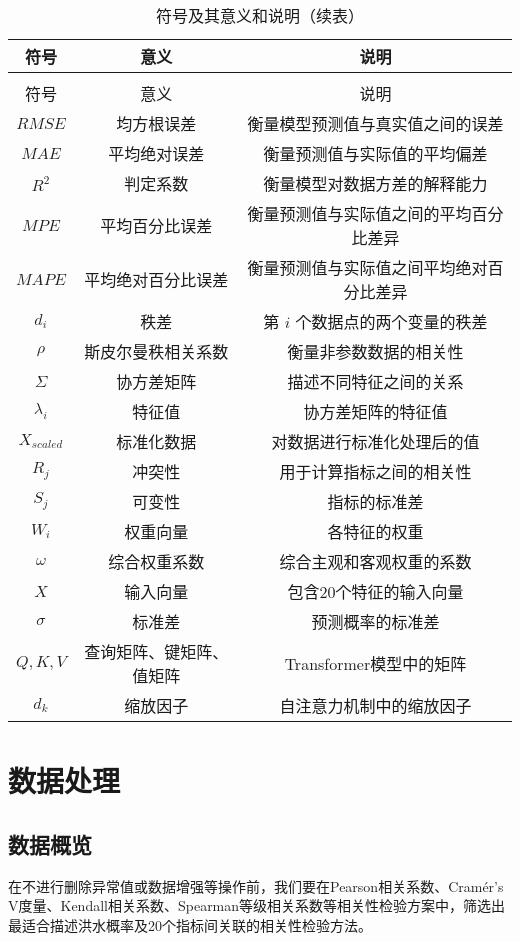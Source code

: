 \documentclass[withoutpreface,bwprint]{cumcmthesis} %
\begin{document}
\begin{longtable}[c]{ccc}
	\caption{本文所用符号的相关说明与解释} \label{table1} \\
	\toprule[1.5pt]
	符号 & 意义 & 说明 \\
	\midrule
	\endfirsthead
	\caption[]{符号及其意义和说明（续表）} \\
	\toprule[1.5pt]
	符号 & 意义 & 说明 \\
	\midrule
	\endhead
	\midrule
	\endfoot
	\bottomrule[1.5pt]
	\endlastfoot
	 $RMSE$ & 均方根误差 & 衡量模型预测值与真实值之间的误差 \\
	$MAE$ & 平均绝对误差 & 衡量预测值与实际值的平均偏差 \\
	$R^2$ & 判定系数 & 衡量模型对数据方差的解释能力 \\
	$MPE$ & 平均百分比误差 & 衡量预测值与实际值之间的平均百分比差异 \\
	$MAPE$ & 平均绝对百分比误差 & 衡量预测值与实际值之间平均绝对百分比差异 \\
	$d_i$ & 秩差 & 第 $i$ 个数据点的两个变量的秩差 \\
	$\rho$ & 斯皮尔曼秩相关系数 & 衡量非参数数据的相关性 \\
	$\Sigma$ & 协方差矩阵 & 描述不同特征之间的关系 \\
	$\lambda_i$ & 特征值 & 协方差矩阵的特征值 \\
	$X_{scaled}$ & 标准化数据 & 对数据进行标准化处理后的值 \\
	$R_j$ & 冲突性 & 用于计算指标之间的相关性 \\
	$S_j$ & 可变性 & 指标的标准差 \\
	$W_i$ & 权重向量 & 各特征的权重 \\
	$\omega$ & 综合权重系数 & 综合主观和客观权重的系数 \\
	$X$ & 输入向量 & 包含20个特征的输入向量 \\
	$\sigma$ & 标准差 & 预测概率的标准差 \\
	$Q, K, V$ & 查询矩阵、键矩阵、值矩阵 & Transformer模型中的矩阵 \\
	$d_k$ & 缩放因子 & 自注意力机制中的缩放因子 \\
	\bottomrule
\end{longtable}


\section{数据处理}

\subsection{数据概览}
在不进行删除异常值或数据增强等操作前，我们要在Pearson相关系数、Cramér's V度量、Kendall相关系数、Spearman等级相关系数等相关性检验方案中，筛选出最适合描述洪水概率及20个指标间关联的相关性检验方法。
\end{document}
